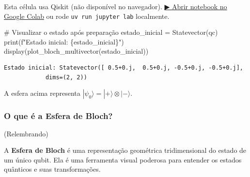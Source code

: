 \documentclass[
  brazilian,
]{report}
\newenvironment{Shaded}{\begin{snugshade}}{\end{snugshade}}
\newcommand{\BuiltInTok}[1]{\textcolor[rgb]{0.00,0.23,0.31}{#1}}
\newcommand{\CommentTok}[1]{\textcolor[rgb]{0.37,0.37,0.37}{#1}}
\newcommand{\NormalTok}[1]{\textcolor[rgb]{0.00,0.23,0.31}{#1}}
\newcommand{\OperatorTok}[1]{\textcolor[rgb]{0.37,0.37,0.37}{#1}}
\newcommand{\SpecialCharTok}[1]{\textcolor[rgb]{0.37,0.37,0.37}{#1}}
\newcommand{\SpecialStringTok}[1]{\textcolor[rgb]{0.13,0.47,0.30}{#1}}
\begin{document}
\begin{tcolorbox}[enhanced jigsaw, arc=.35mm, bottomrule=.15mm, bottomtitle=1mm, breakable, colback=white, colbacktitle=quarto-callout-warning-color!10!white, colframe=quarto-callout-warning-color-frame, coltitle=black, left=2mm, leftrule=.75mm, opacityback=0, opacitybacktitle=0.6, rightrule=.15mm, title=\textcolor{quarto-callout-warning-color}{\faExclamationTriangle}\hspace{0.5em}{⚛️ Célula Qiskit --- execute no Colab ou localmente}, titlerule=0mm, toprule=.15mm, toptitle=1mm]

Esta célula usa Qiskit (não disponível no navegador).
\href{https://colab.research.google.com/github/maxwellamaral/aula-quantum/blob/main/notebooks/05-interference.ipynb}{▶
Abrir notebook no Google Colab} ou rode \texttt{uv\ run\ jupyter\ lab}
localmente.

\begin{Shaded}
\begin{Highlighting}[]

\CommentTok{\# Visualizar o estado após preparação}
\NormalTok{estado\_inicial }\OperatorTok{=}\NormalTok{ Statevector(qc)}
\BuiltInTok{print}\NormalTok{(}\SpecialStringTok{f"Estado inicial: }\SpecialCharTok{\{}\NormalTok{estado\_inicial}\SpecialCharTok{\}}\SpecialStringTok{"}\NormalTok{)}
\NormalTok{display(plot\_bloch\_multivector(estado\_inicial))}
\end{Highlighting}
\end{Shaded}

\end{tcolorbox}

\begin{verbatim}
Estado inicial: Statevector([ 0.5+0.j,  0.5+0.j, -0.5+0.j, -0.5+0.j],
            dims=(2, 2))
\end{verbatim}

A esfera acima representa
\(|\psi_0\rangle = |+\rangle \otimes |-\rangle\).

\subsubsection{O que é a Esfera de
Bloch?}\label{o-que-uxe9-a-esfera-de-bloch}

(Relembrando)

A \textbf{Esfera de Bloch} é uma representação geométrica tridimensional
do estado de um único qubit. Ela é uma ferramenta visual poderosa para
entender os estados quânticos e suas transformações.
\end{document}
